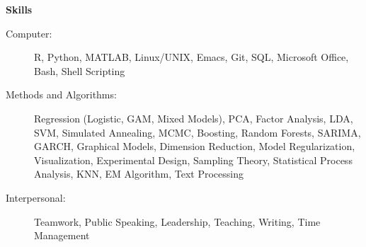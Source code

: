 \documentclass[letterpaper,11pt]{article}
\newcommand{\resheading}[1]{\colorbox{resBlue}{\begin{minipage}{\textwidth}
			\textbf{#1}
\end{minipage}} \vspace{-14pt}}
\begin{document}
\resheading{Skills}
\begin{description}
	\item[Computer:] 
	{\footnotesize R, Python, MATLAB, Linux/UNIX, Emacs, Git, SQL, Microsoft Office, Bash, Shell Scripting} \vspace{-3pt}
	\item[Methods and Algorithms:] 
	\begin{comment}{\footnotesize Dimension Reduction, Data Visualization, Machine Learning, Time Series, Experimental Design and Analysis, Sampling Methods, (Computational) Statistical Analysis, Statistical Learning, Text Analysis}
	\end{comment}
	{\footnotesize Regression (Logistic, GAM, Mixed Models), PCA, Factor Analysis, LDA, SVM, Simulated Annealing, MCMC, Boosting, Random Forests, SARIMA, GARCH, Graphical Models, Dimension Reduction, Model Regularization, Visualization, Experimental Design, Sampling Theory, Statistical Process Analysis, KNN, EM Algorithm, Text Processing} \vspace{-3pt}
	\item[Interpersonal:] 
	{\footnotesize Teamwork, Public Speaking, Leadership, Teaching, Writing, Time Management}
\end{description}
\end{document}
